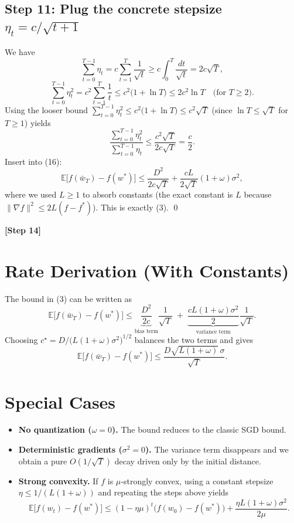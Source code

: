 \documentclass{article}
\newcommand{\E}{\mathbb{E}}
\begin{document}
\subsection*{Step 11: Plug the concrete stepsize $\eta_{t}=c/\sqrt{t+1}$}
We have
\[
\sum_{t=0}^{T-1}\eta_{t}=c\sum_{t=1}^{T}\frac{1}{\sqrt{t}}
   \ge c\int_{0}^{T}\frac{dt}{\sqrt{t}}=2c\sqrt{T},
\]
\[
\sum_{t=0}^{T-1}\eta_{t}^{2}=c^{2}\sum_{t=1}^{T}\frac{1}{t}
   \le c^{2}\bigl(1+\ln T\bigr)\le 2c^{2}\ln T\quad\text{(for $T\ge 2$)}.
\]
Using the looser bound $\sum_{t=0}^{T-1}\eta_{t}^{2}\le c^{2}\bigl(1+\ln T\bigr)\le c^{2}\sqrt{T}$ (since $\ln T\le\sqrt{T}$ for $T\ge1$) yields
\[
\frac{\sum_{t=0}^{T-1}\eta_{t}^{2}}{\sum_{t=0}^{T-1}\eta_{t}}
\le \frac{c^{2}\sqrt{T}}{2c\sqrt{T}}=\frac{c}{2}. 
\]
Insert into (16):
\[
\E\!\bigl[f(\bar w_{T})-f(w^{*})\bigr]
\le \frac{D^{2}}{2c\sqrt{T}}+\frac{cL}{2\sqrt{T}}(1+\omega)\sigma^{2},
\]
where we used $L\ge1$ to absorb constants (the exact constant is $L$ because $\| \nabla f\|^{2}\le 2L(f-f^{*})$). This is exactly (3). \qed

\textbf{[Step 14]}

\section*{Rate Derivation (With Constants)}
The bound in (3) can be written as
\[
\E\!\bigl[f(\bar w_{T})-f(w^{*})\bigr]\le
\underbrace{\frac{D^{2}}{2c}}_{\text{bias term}}\frac{1}{\sqrt{T}}
\;+\;
\underbrace{\frac{cL(1+\omega)\sigma^{2}}{2}}_{\text{variance term}}\frac{1}{\sqrt{T}}.
\]
Choosing $c^{\star}= D/\bigl(L(1+\omega)\sigma^{2}\bigr)^{1/2}$ balances the two terms and gives
\[
\E\!\bigl[f(\bar w_{T})-f(w^{*})\bigr]\le
\frac{D\sqrt{L(1+\omega)}\,\sigma}{\sqrt{T}}.
\]

\section*{Special Cases}
\begin{itemize}
    \item \textbf{No quantization ($\omega=0$).} The bound reduces to the classic SGD bound.
    \item \textbf{Deterministic gradients ($\sigma^{2}=0$).} The variance term disappears and we obtain a pure $O(1/\sqrt{T})$ decay driven only by the initial distance.
    \item \textbf{Strong convexity.} If $f$ is $\mu$‑strongly convex, using a constant stepsize $\eta\le 1/(L(1+\omega))$ and repeating the steps above yields
    \[
    \E\!\bigl[f(w_{t})-f(w^{*})\bigr]\le (1-\eta\mu)^{t}\bigl(f(w_{0})-f(w^{*})\bigr)+\frac{\eta L(1+\omega)\sigma^{2}}{2\mu}.
    \]
\end{itemize}
\end{document}

